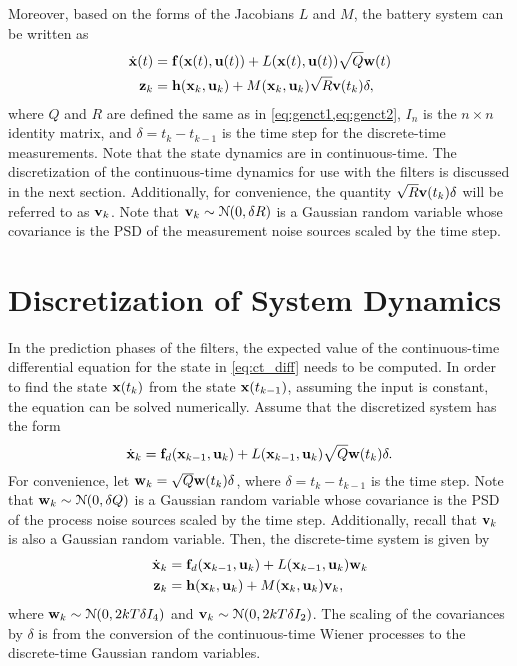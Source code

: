 \documentclass[../zhang_thesis.tex]{subfiles}
\begin{document}
Moreover, based on the forms of the Jacobians $L$ and $M$, the battery system can be written as
\begin{align}
    \dot{\mathbf{x}}(t) &= \mathbf{f}(\mathbf{x}(t),\mathbf{u}(t)) + L(\mathbf{x}(t),\mathbf{u}(t)) \sqrt{Q} \mathbf{w}(t) \label{eq:ct_diff} \\
    \mathbf{z}_k &= \mathbf{h}(\mathbf{x}_k,\mathbf{u}_k) + M(\mathbf{x}_k,\mathbf{u}_k) \sqrt{R} \mathbf{v}(t_k) \delta,
\end{align}
where $Q$ and $R$ are defined the same as in \cref{eq:genct1,eq:genct2}, $I_n$ is the $n\times n$ identity matrix, and $\delta=t_k-t_{k-1}$ is the time step for the discrete-time measurements. Note that the state dynamics are in continuous-time. The discretization of the continuous-time dynamics for use with the filters is discussed in the next section. Additionally, for convenience, the quantity $\sqrt{R} \mathbf{v}(t_k) \delta$ will be referred to as $\mathbf{v}_k$. Note
that $\mathbf{v}_k\sim\mathcal{N}(0,\delta R)$ is a Gaussian random variable whose covariance is the PSD of the measurement noise sources scaled by the time step.

\section{Discretization of System Dynamics}
\label{sec:discret}

In the prediction phases of the filters, the expected value of the continuous-time differential equation for the state in \cref{eq:ct_diff} needs to be computed. In order to find the state $\mathbf{x}(t_k)$ from the state $\mathbf{x}(t_{k-1})$, assuming the input is constant, the equation can be solved numerically. Assume that the discretized system has the form
\begin{equation}
    \dot{\mathbf{x}}_k = \mathbf{f}_d(\mathbf{x}_{k-1},\mathbf{u}_k) + L(\mathbf{x}_{k-1},\mathbf{u}_k) \sqrt{Q} \mathbf{w}(t_k) \delta.
\end{equation}
For convenience, let $\mathbf{w}_k=\sqrt{Q} \mathbf{w}(t_k) \delta$, where $\delta=t_k-t_{k-1}$ is the time step. Note that $\mathbf{w}_k\sim\mathcal{N}(0,\delta Q)$ is a Gaussian random variable whose covariance is the PSD of the process noise sources scaled by the time step. Additionally, recall that $\mathbf{v}_k$ is also a Gaussian random variable. Then, the discrete-time system is given by
\begin{align}
    \dot{\mathbf{x}}_k &= \mathbf{f}_d(\mathbf{x}_{k-1},\mathbf{u}_k) + L(\mathbf{x}_{k-1},\mathbf{u}_k) \mathbf{w}_k \label{eq:dt1} \\
    \mathbf{z}_k &= \mathbf{h}(\mathbf{x}_k,\mathbf{u}_k) + M(\mathbf{x}_k,\mathbf{u}_k) \mathbf{v}_k, \label{eq:dt2}
\end{align}
where $\mathbf{w}_k\sim\mathcal{N}(0,2kT\delta I_4)$ and $\mathbf{v}_k\sim\mathcal{N}(0,2kT\delta I_2)$. The scaling of the covariances by $\delta$ is from the conversion of the continuous-time Wiener processes to the discrete-time Gaussian random variables.
\end{document}
